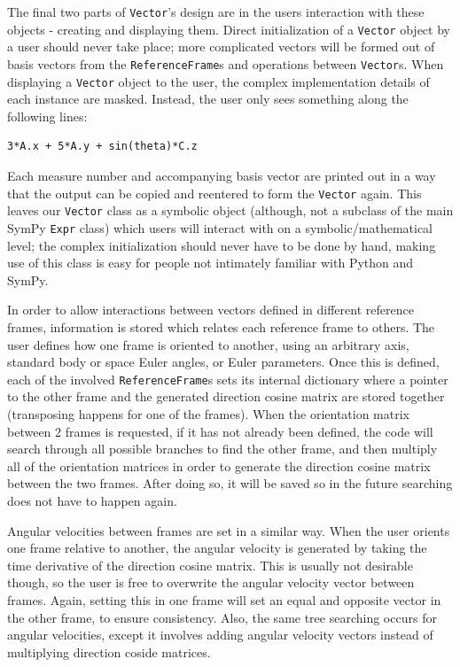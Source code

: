 \documentclass[twocolumn,10pt]{asme2e}
\begin{document}
The final two parts of \verb|Vector|'s design are in the users interaction with
these objects - creating and displaying them.
Direct initialization of a \verb|Vector| object by a user should never take
place; more complicated vectors will be formed out of basis vectors from the
\verb|ReferenceFrame|s and operations between \verb|Vector|s.
When displaying a \verb|Vector| object to the user, the complex implementation
details of each instance are masked.
Instead, the user only sees something along the following lines:
\begin{verbatim}
3*A.x + 5*A.y + sin(theta)*C.z
\end{verbatim}
Each measure number and accompanying basis vector are printed out in a way that
the output can be copied and reentered to form the \verb|Vector| again.
This leaves our \verb|Vector| class as a symbolic object (although, not a
subclass of the main SymPy \verb|Expr| class) which users will interact with on
a symbolic/mathematical level; the complex initialization should never have to
be done by hand, making use of this class is easy for people not intimately
familiar with Python and SymPy.

In order to allow interactions between vectors defined in different reference
frames, information is stored which relates each reference frame to others.
The user defines how one frame is oriented to another, using an arbitrary axis,
standard body or space Euler angles, or Euler parameters.
Once this is defined, each of the involved \verb|ReferenceFrame|s sets its
internal dictionary where a pointer to the other frame and the generated
direction cosine matrix are stored together (transposing happens for one of the
frames).
When the orientation matrix between 2 frames is requested, if it has not
already been defined, the code will search through all possible branches to
find the other frame, and then multiply all of the orientation matrices in
order to generate the direction cosine matrix between the two frames.
After doing so, it will be saved so in the future searching does not have to
happen again.

Angular velocities between frames are set in a similar way.
When the user orients one frame relative to another, the angular velocity is
generated by taking the time derivative of the direction cosine matrix.
This is usually not desirable though, so the user is free to overwrite the
angular velocity vector between frames.
Again, setting this in one frame will set an equal and opposite vector in the
other frame, to ensure consistency.
Also, the same tree searching occurs for angular velocities, except it involves
adding angular velocity vectors instead of multiplying direction coside matrices.
\end{document}
